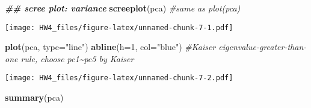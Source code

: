 \documentclass[
]{article}
\newenvironment{Shaded}{\begin{snugshade}}{\end{snugshade}}
\newcommand{\AttributeTok}[1]{\textcolor[rgb]{0.13,0.29,0.53}{#1}}
\newcommand{\CommentTok}[1]{\textcolor[rgb]{0.56,0.35,0.01}{\textit{#1}}}
\newcommand{\DecValTok}[1]{\textcolor[rgb]{0.00,0.00,0.81}{#1}}
\newcommand{\DocumentationTok}[1]{\textcolor[rgb]{0.56,0.35,0.01}{\textbf{\textit{#1}}}}
\newcommand{\FunctionTok}[1]{\textcolor[rgb]{0.13,0.29,0.53}{\textbf{#1}}}
\newcommand{\NormalTok}[1]{#1}
\newcommand{\OtherTok}[1]{\textcolor[rgb]{0.56,0.35,0.01}{#1}}
\newcommand{\SpecialCharTok}[1]{\textcolor[rgb]{0.81,0.36,0.00}{\textbf{#1}}}
\newcommand{\StringTok}[1]{\textcolor[rgb]{0.31,0.60,0.02}{#1}}
\begin{document}
\begin{Shaded}
\end{Shaded}

\begin{Shaded}
\begin{Highlighting}[]
\DocumentationTok{\#\# scree plot: variance}
\FunctionTok{screeplot}\NormalTok{(pca) }\CommentTok{\#same as plot(pca)}
\end{Highlighting}
\end{Shaded}

\texttt{[image: HW4\_files/figure-latex/unnamed-chunk-7-1.pdf]}

\begin{Shaded}
\begin{Highlighting}[]
\FunctionTok{plot}\NormalTok{(pca, }\AttributeTok{type=}\StringTok{"line"}\NormalTok{)}
\FunctionTok{abline}\NormalTok{(}\AttributeTok{h=}\DecValTok{1}\NormalTok{, }\AttributeTok{col=}\StringTok{"blue"}\NormalTok{) }\CommentTok{\#Kaiser eigenvalue{-}greater{-}than{-}one rule, choose pc1\textasciitilde{}pc5 by Kaiser}
\end{Highlighting}
\end{Shaded}

\texttt{[image: HW4\_files/figure-latex/unnamed-chunk-7-2.pdf]}

\begin{Shaded}
\begin{Highlighting}[]
\FunctionTok{summary}\NormalTok{(pca)}
\end{Highlighting}
\end{Shaded}
\end{document}
